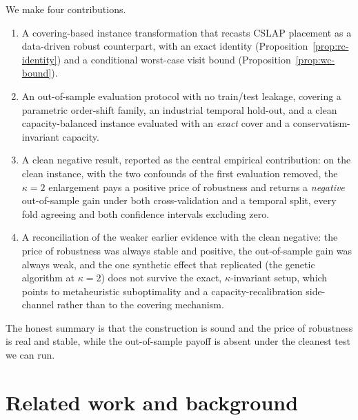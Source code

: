 \documentclass[preprint,review,11pt,authoryear]{elsarticle}
\begin{document}
We make four contributions.
\begin{enumerate}
  \item A covering-based instance transformation that recasts CSLAP placement as a data-driven robust counterpart, with an exact identity (Proposition~\ref{prop:rc-identity}) and a conditional worst-case visit bound (Proposition~\ref{prop:wc-bound}).
  \item An out-of-sample evaluation protocol with no train/test leakage, covering a parametric order-shift family, an industrial temporal hold-out, and a clean capacity-balanced instance evaluated with an \emph{exact} cover and a conservatism-invariant capacity.
  \item A clean negative result, reported as the central empirical contribution: on the clean instance, with the two confounds of the first evaluation removed, the $\kappa=2$ enlargement pays a positive price of robustness and returns a \emph{negative} out-of-sample gain under both cross-validation and a temporal split, every fold agreeing and both confidence intervals excluding zero.
  \item A reconciliation of the weaker earlier evidence with the clean negative: the price of robustness was always stable and positive, the out-of-sample gain was always weak, and the one synthetic effect that replicated (the genetic algorithm at $\kappa=2$) does not survive the exact, $\kappa$-invariant setup, which points to metaheuristic suboptimality and a capacity-recalibration side-channel rather than to the covering mechanism.
\end{enumerate}

The honest summary is that the construction is sound and the price of robustness is real and stable, while the out-of-sample payoff is absent under the cleanest test we can run.

\section{Related work and background}\label{sec:rc-related}
\end{document}
